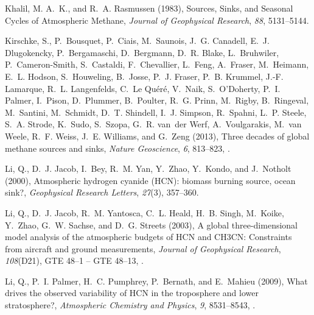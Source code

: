 \documentclass[draft,linenumbers]{AGUJournal}
\begin{document}
\begin{thebibliography}{51}
Khalil, M. A.~K., and R.~A. Rasmussen (1983), {Sources, Sinks, and Seasonal
  Cycles of Atmospheric Methane}, \textit{Journal of Geophysical Research},
  \textit{88}, 5131--5144.

Kirschke, S., P.~Bousquet, P.~Ciais, M.~Saunois, J.~G. Canadell, E.~J.
  Dlugokencky, P.~Bergamaschi, D.~Bergmann, D.~R. Blake, L.~Bruhwiler,
  P.~Cameron-Smith, S.~Castaldi, F.~Chevallier, L.~Feng, A.~Fraser, M.~Heimann,
  E.~L. Hodson, S.~Houweling, B.~Josse, P.~J. Fraser, P.~B. Krummel, J.-F.
  Lamarque, R.~L. Langenfelds, C.~{Le Qu{\'{e}}r{\'{e}}}, V.~Naik,
  S.~O'Doherty, P.~I. Palmer, I.~Pison, D.~Plummer, B.~Poulter, R.~G. Prinn,
  M.~Rigby, B.~Ringeval, M.~Santini, M.~Schmidt, D.~T. Shindell, I.~J. Simpson,
  R.~Spahni, L.~P. Steele, S.~A. Strode, K.~Sudo, S.~Szopa, G.~R. van~der Werf,
  A.~Voulgarakis, M.~van Weele, R.~F. Weiss, J.~E. Williams, and G.~Zeng
  (2013), {Three decades of global methane sources and sinks}, \textit{Nature
  Geoscience}, \textit{6}, 813--823, .

Li, Q., D.~J. Jacob, I.~Bey, R.~M. Yan, Y.~Zhao, Y.~Kondo, and J.~Notholt
  (2000), {Atmospheric hydrogen cyanide (HCN): biomass burning source, ocean
  sink?}, \textit{Geophysical Research Letters}, \textit{27}(3), 357--360.

Li, Q., D.~J. Jacob, R.~M. Yantosca, C.~L. Heald, H.~B. Singh, M.~Koike,
  Y.~Zhao, G.~W. Sachse, and D.~G. Streets (2003), {A global three-dimensional
  model analysis of the atmospheric budgets of HCN and CH3CN: Constraints from
  aircraft and ground measurements}, \textit{Journal of Geophysical Research},
  \textit{108}(D21), GTE 48--1 -- GTE 48--13, .

Li, Q., P.~I. Palmer, H.~C. Pumphrey, P.~Bernath, and E.~Mahieu (2009), {What
  drives the observed variability of HCN in the troposphere and lower
  stratosphere?}, \textit{Atmospheric Chemistry and Physics}, \textit{9},
  8531--8543, .


\end{thebibliography}
\end{document}
